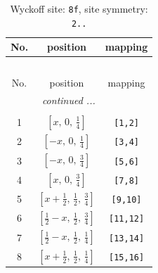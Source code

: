 \documentclass[fleqn,8pt]{jsarticle}
\begin{document}
\begin{longtable}{ccc}
\caption{Wyckoff site: {\tt 8f}, site symmetry: {\tt 2..}}
 \\
 \hline \hline
No. & position & mapping \\ \hline \endfirsthead

\multicolumn{2}{l}{\tablename\ \thetable{}} \\
 \hline \hline
No. & position & mapping \\ \hline \endhead

 \hline \hline
\multicolumn{2}{r}{\footnotesize\it continued ...} \\ \endfoot

 \hline \hline
\multicolumn{2}{r}{} \\ \endlastfoot

1 & $\left[ x,\, 0,\, \frac{1}{4} \right]$ & {\tt [1,2]} \\ \hline
2 & $\left[ - x,\, 0,\, \frac{1}{4} \right]$ & {\tt [3,4]} \\ \hline
3 & $\left[ - x,\, 0,\, \frac{3}{4} \right]$ & {\tt [5,6]} \\ \hline
4 & $\left[ x,\, 0,\, \frac{3}{4} \right]$ & {\tt [7,8]} \\ \hline
5 & $\left[ x + \frac{1}{2},\, \frac{1}{2},\, \frac{3}{4} \right]$ & {\tt [9,10]} \\ \hline
6 & $\left[ \frac{1}{2} - x,\, \frac{1}{2},\, \frac{3}{4} \right]$ & {\tt [11,12]} \\ \hline
7 & $\left[ \frac{1}{2} - x,\, \frac{1}{2},\, \frac{1}{4} \right]$ & {\tt [13,14]} \\ \hline
8 & $\left[ x + \frac{1}{2},\, \frac{1}{2},\, \frac{1}{4} \right]$ & {\tt [15,16]} \\
\end{longtable}
\renewcommand{\arraystretch}{1.2}
\end{document}
